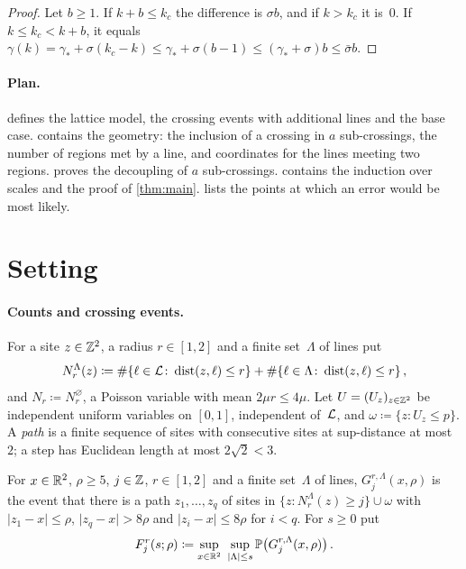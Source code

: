 \documentclass[11pt,letterpaper]{article}
\DeclareMathOperator{\dist}{dist}
\begin{document}
\begin{proof}
Let $b\ge1$. If $k+b\le k_c$ the difference is $\sigma b$, and if $k>k_c$ it is~$0$. If $k\le k_c<k+b$, it equals $\gamma(k)=\gamma_*+\sigma(k_c-k)\le\gamma_*+\sigma(b-1)\le(\gamma_*+\sigma)b\le\bar\sigma b$.
\end{proof}

\paragraph{Plan.}  defines the lattice model, the crossing events with additional lines and the base case.  contains the geometry: the inclusion of a crossing in $a$ sub-crossings, the number of regions met by a line, and coordinates for the lines meeting two regions.  proves the decoupling of $a$ sub-crossings.  contains the induction over scales and the proof of \cref{thm:main}.  lists the points at which an error would be most likely.

\section{Setting}
\label{sec:setting}

\paragraph{Counts and crossing events.} For a site $z\in\mathbb Z^2$, a radius $r\in[1,2]$ and a finite set~$\Lambda$ of lines put
\begin{equation*}
  N_r^{\Lambda}(z)\coloneqq\#\{\ell\in\cL\colon\dist(z,\ell)\le r\}+\#\{\ell\in\Lambda\colon\dist(z,\ell)\le r\}\,,
\end{equation*}
and $N_r\coloneqq N_r^\varnothing$, a Poisson variable with mean $2\mu r\le4\mu$. Let $U=(U_z)_{z\in\mathbb Z^2}$ be independent uniform variables on $[0,1]$, independent of~$\mathcal L$, and $\omega\coloneqq\{z\colon U_z\le p\}$. A \emph{path} is a finite sequence of sites with consecutive sites at sup-distance at most~$2$; a step has Euclidean length at most $2\sqrt2<3$.

\begin{definition}
\label{def:G}
For $x\in\mathbb R^2$, $\rho\ge5$, $j\in\mathbb Z$, $r\in[1,2]$ and a finite set~$\Lambda$ of lines, $G_j^{r,\Lambda}(x,\rho)$ is the event that there is a path $z_1,\dots,z_q$ of sites in $\{z\colon N_r^\Lambda(z)\ge j\}\cup\omega$ with $\lvert z_1-x\rvert\le\rho$, $\lvert z_q-x\rvert>8\rho$ and $\lvert z_i-x\rvert\le8\rho$ for $i<q$. For $s\ge0$ put
\begin{equation*}
  F_j^r(s;\rho)\coloneqq\sup_{x\in\R^2}\ \sup_{\lvert\Lambda\rvert\le s}\P\bigl(G_j^{r,\Lambda}(x,\rho)\bigr)\,.
\end{equation*}
\end{definition}
\end{document}
